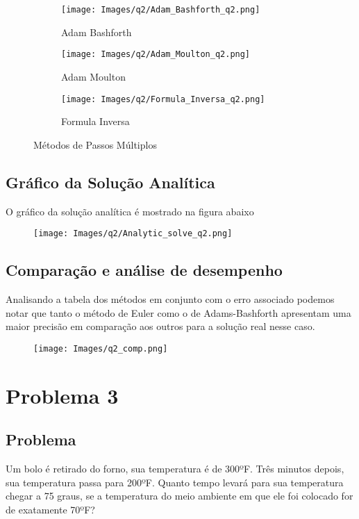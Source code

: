 \documentclass[12pt]{article}
\begin{document}
\begin{figure}[H]
\begin{subfigure}{.5\textwidth}
  \centering
  \texttt{[image: Images/q2/Adam\_Bashforth\_q2.png]}  
  \caption{Adam Bashforth}
\end{subfigure}
\begin{subfigure}{.5\textwidth}
  \centering
  \texttt{[image: Images/q2/Adam\_Moulton\_q2.png]}  
  \caption{Adam Moulton}
\end{subfigure}

\newline

\begin{subfigure}{.5\textwidth}
  \centering
  \texttt{[image: Images/q2/Formula\_Inversa\_q2.png]}  
  \caption{Formula Inversa}
\end{subfigure}
\caption{Métodos de Passos Múltiplos}
\end{figure}

\subsection{Gráfico da Solução Analítica}
O gráfico da solução analítica é mostrado na figura abaixo

\begin{figure}[H]
\centering
\texttt{[image: Images/q2/Analytic\_solve\_q2.png]}
\label{fig_q2_SA}
\end{figure}
\subsection{Comparação e análise de desempenho}
Analisando a tabela dos métodos em conjunto com o erro associado podemos notar que tanto o método de Euler como o de Adams-Bashforth apresentam uma maior precisão em comparação aos outros para a solução real nesse caso.
\begin{figure}[H]
\centering
\texttt{[image: Images/q2\_comp.png]}
\label{fig_q2_comp}
\end{figure}




\section{Problema 3}

\subsection{Problema}
Um bolo é retirado do forno, sua temperatura é de 300ºF. Três minutos depois, sua temperatura passa para 200ºF. Quanto tempo levará para sua temperatura chegar a 75 graus, se a temperatura do meio ambiente em que ele foi colocado for de exatamente 70ºF?
\end{document}
